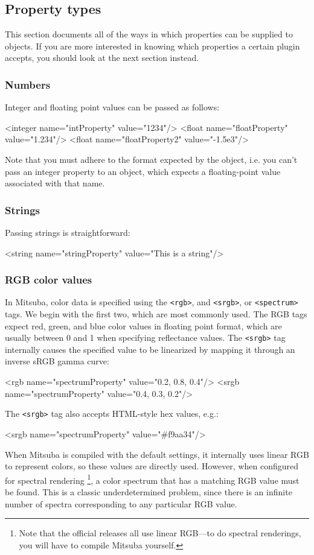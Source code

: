 \subsection{Property types}
This section documents all of the ways in which properties can be supplied to objects. If you are more
interested in knowing which properties a certain plugin accepts, you should look at the next section instead.
\subsubsection{Numbers}
Integer and floating point values can be passed as follows:
\begin{xml}
<integer name="intProperty" value="1234"/>
<float name="floatProperty" value="1.234"/>
<float name="floatProperty2" value="-1.5e3"/>
\end{xml}
Note that you must adhere to the format expected by the object, i.e. you can't pass an integer property
to an object, which expects a floating-point value associated with that name.
\subsubsection{Strings}
Passing strings is straightforward:
\begin{xml}
<string name="stringProperty" value="This is a string"/>
\end{xml}
\subsubsection{RGB color values}
In Mitsuba, color data is specified using the \texttt{<rgb>}, and \texttt{<srgb>}, or \texttt{<spectrum>} tags.
We begin with the first two, which are most commonly used. The RGB tags expect
red, green, and blue color values in floating point format, which are usually between 0 and 1 when
specifying reflectance values. The \texttt{<srgb>} tag internally causes the specified value
to be linearized by mapping it through an inverse sRGB gamma curve:
\begin{xml}
<rgb name="spectrumProperty" value="0.2, 0.8, 0.4"/>
<srgb name="spectrumProperty" value="0.4, 0.3, 0.2"/>
\end{xml}
The \texttt{<srgb>} tag also accepts HTML-style hex values, e.g.:
\begin{xml}
<srgb name="spectrumProperty" value="#f9aa34"/>
\end{xml}
When Mitsuba is compiled with the default settings, it internally uses
linear RGB to represent colors, so these values are directly used.
However, when configured for spectral rendering
\footnote{Note that the official
releases all use linear RGB---to do spectral renderings, you will have
to compile Mitsuba yourself.}, a color
spectrum that has a matching RGB value must be found. This is a classic underdetermined problem,
since there is an infinite number of spectra corresponding to any particular RGB value.

